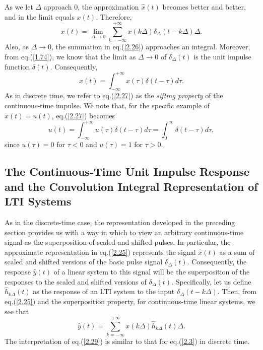\documentclass[a4paper,twoside]{book}
\begin{document}
As we let $\Delta$ approach 0, the approximation $\hat{x}(t)$ becomes better and better, and in the limit equals $x(t)$. Therefore,
\begin{equation}
    x(t) = \lim_{\Delta\to0}\sum_{k=-\infty}^{+\infty}x(k\Delta)\delta_{\Delta}(t-k\Delta)\Delta.
    \label{2.26}
\end{equation}
Also, as $\Delta\to 0$, the summation in eq.\;(\ref{2.26}) approaches an integral. Moreover, from eq.\;(\ref{1.74}), we know that the limit as $\Delta\to 0$ of $\delta_\Delta(t)$ is the unit impulse function $\delta(t)$. Consequently,
\begin{equation}
    x(t) = \int_{-\infty}^{+\infty}x(\tau)\delta(t-\tau)d\tau.
    \label{2.27}
\end{equation}
As in discrete time, we refer to eq.\;(\ref{2.27}) as the \textit{sifting property} of the continuous-time impulse. We note that, for the specific example of $x(t)=u(t)$, eq.\;(\ref{2.27}) becomes
\begin{equation}
    u(t) = \int_{-\infty}^{+\infty}u(\tau)\delta(t-\tau)d\tau = \int_{0}^{\infty}\delta(t-\tau)d\tau,
    \label{2.28}
\end{equation}
since $u(\tau)=0$ for $\tau<0$ and $u(\tau)=1$ for $\tau>0$.

\subsection{The Continuous-Time Unit Impulse Response and the Convolution Integral Representation of LTI Systems}

As in the discrete-time case, the representation developed in the preceding section provides us with a way in which to view an arbitrary continuous-time signal as the superposition of scaled and shifted pulses. In particular, the approximate representation in eq.\;(\ref{2.25}) represents the signal $\hat{x}(t)$ as a sum of scaled and shifted versions of the basic pulse signal $\delta_\Delta(t)$. Consequently, the response $\hat{y}(t)$ of a linear system to this signal will be the superposition of the responses to the scaled and shifted versions of $\delta_\Delta(t)$. Specifically, let us define $\hat{h}_{k\Delta}(t)$ as the response of an LTI system to the input $\delta_\Delta(t-k\Delta)$. Then, from eq.\;(\ref{2.25}) and the superposition property, for continuous-time linear systems, we see that
\begin{equation}
    \hat{y}(t) = \sum_{k=-\infty}^{+\infty}x(k\Delta)\hat{h}_{k\Delta}(t)\Delta.
    \label{2.29}
\end{equation}
The interpretation of eq.\;(\ref{2.29}) is similar to that for eq.\;(\ref{2.3}) in discrete time.
\end{document}
